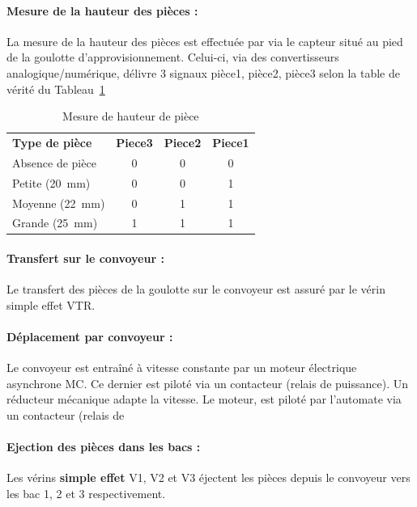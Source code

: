 \documentclass[11pt, multicol]{article}
\begin{document}
\paragraph{Mesure de la hauteur des pièces : }La mesure de la hauteur des pièces est effectuée par via le capteur situé au pied de la goulotte d’approvisionnement. Celui-ci, via des convertisseurs analogique/numérique, délivre 3 signaux pièce1, pièce2, pièce3 selon la table de vérité du Tableau~\ref{tab:hauteurPiece}
\begin{table}[ht]
	\centering
	\begin{tabular}{lccc}
		\textbf{Type de pièce} & \textbf{Piece3} & \textbf{Piece2} & \textbf{Piece1}\\
		Absence de pièce       & 0               & 0               & 0              \\
		Petite (\SI{20}{mm}) 	 & 0               & 0               & 1              \\
		Moyenne (\SI{22}{mm})  & 0               & 1               & 1              \\
		Grande (\SI{25}{mm})   & 1               & 1               & 1              \\
	\end{tabular}
	\caption{Mesure de hauteur de pièce}
	\label{tab:hauteurPiece}
\end{table}




\paragraph{Transfert sur le convoyeur : } Le transfert des pièces de la goulotte sur le convoyeur est assuré par le vérin simple effet VTR.

\paragraph{Déplacement par convoyeur : } Le convoyeur est entraîné à vitesse constante par un moteur électrique asynchrone MC. Ce dernier est piloté via un contacteur (relais de puissance).
Un réducteur mécanique adapte la vitesse. Le moteur, est piloté par l’automate via un contacteur (relais de

\paragraph{Ejection des pièces dans les bacs : } Les vérins \textbf{simple effet} V1, V2 et V3 éjectent les pièces depuis le convoyeur vers les bac 1, 2 et 3 respectivement.
\end{document}

